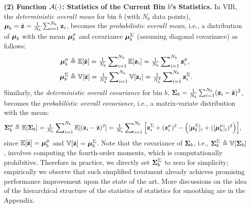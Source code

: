 \textbf{(2) Function ${\mathcal A}(\cdot)$: Statistics of the Current Bin $b$'s Statistics.} 
In VIR, the \emph{deterministic overall mean} for bin $b$ (with $N_b$ data points), $\mbox{\boldmath$\mu$\unboldmath}_{b}=\bar{{\bf z}}=\tfrac{1}{N_b} \sum^{N_b}_{i=1} {\bf z}_i$, becomes the \emph{probabilistic overall mean}, i.e., a distribution of $\mbox{\boldmath$\mu$\unboldmath}_{b}$ with the mean $\mbox{\boldmath$\mu$\unboldmath}_b^{\mu}$ and covariance $\mbox{\boldmath$\mu$\unboldmath}_b^{\Sigma}$ (assuming diagonal covariance) as follows: 
%
\begin{align*}
\mbox{\boldmath$\mu$\unboldmath}_b^{\mu} &\triangleq \mathbb{E}[\Bar{{\bf z}}] = \tfrac{1}{N_b} \sum\nolimits^{N_b}_{i=1} \mathbb{E}[{\bf z}_i] = \tfrac{1}{N_b} \sum\nolimits^{N_b}_{i=1} {\bf z}_i^{\mu}, \\ 
\mbox{\boldmath$\mu$\unboldmath}_b^{\Sigma} &\triangleq \mathbb{V}[\Bar{{\bf z}}] = \tfrac{1}{N_b^{2}} \sum\nolimits^{N_b}_{i=1} \mathbb{V}[{\bf z}_i]= \tfrac{1}{N_b^{2}} \sum\nolimits^{N_b}_{i=1} {\bf z}_i^{\Sigma}.
\end{align*}
%
Similarly, the \emph{deterministic overall covariance} for bin $b$, $\mbox{\boldmath$\Sigma$\unboldmath}_{b}=\tfrac{1}{N_b} \sum^{N_b}_{i=1} ({\bf z}_i-\bar{{\bf z}})^2$, becomes the \emph{probabilistic overall covariance}, i.e., a matrix-variate distribution~\citep{gupta2018matrix} with the mean:
%
\begin{align*}
\mbox{\boldmath$\Sigma$\unboldmath}_b^\mu &\triangleq {\mathbb E}[\mbox{\boldmath$\Sigma$\unboldmath}_b] = \tfrac{1}{N_b} \sum\nolimits_{i=1}^{N_b} {\mathbb E}[({\bf z}_i - \Bar{{\bf z}})^2] = \tfrac{1}{N_b} \sum\nolimits_{i=1}^{N_b} \Big[ {\bf z}_i^{\Sigma} + ({\bf z}_i^{\mu})^{2} - \Big( [\mbox{\boldmath$\mu$\unboldmath}_b^{\Sigma}]_i + ([\mbox{\boldmath$\mu$\unboldmath}_b^{\mu}]_i)^{2} \Big) \Big],
\end{align*}
%
since $\mathbb{E}[\Bar{{\bf z}}] = \mbox{\boldmath$\mu$\unboldmath}_b^{\mu}$ and $\mathbb{V}[\Bar{{\bf z}}] = \mbox{\boldmath$\mu$\unboldmath}_b^{\Sigma}$. Note that the covariance of $\mbox{\boldmath$\Sigma$\unboldmath}_b$, i.e., $\mbox{\boldmath$\Sigma$\unboldmath}_b^\Sigma\triangleq {\mathbb V}[\mbox{\boldmath$\Sigma$\unboldmath}_b]$, involves computing the fourth-order moments, which is computationally prohibitive. Therefore in practice, we directly set $\mbox{\boldmath$\Sigma$\unboldmath}_b^\Sigma$ to zero for simplicity; empirically we observe that such simplified treatment already achieves promising performance improvement upon the state of the art. {More discussions on the idea of the hierarchical structure of the statistics of statistics for smoothing are in the Appendix.}

